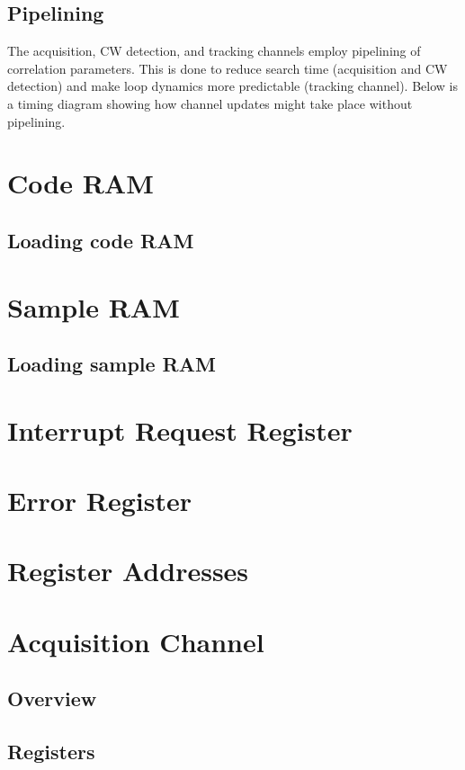 \documentclass{article}
\begin{document}
\begin{multicols}{2}
\subsection{Pipelining}
The acquisition, CW detection, and tracking channels employ pipelining of correlation parameters. This is done to reduce search time (acquisition and CW detection) and make loop dynamics more predictable (tracking channel). Below is a timing diagram showing how channel updates might take place without pipelining.

\section{Code RAM}
\subsection{Loading code RAM}

\section{Sample RAM}
\subsection{Loading sample RAM}

\section{Interrupt Request Register}

\section{Error Register}

\section{Register Addresses}

\hypertarget{acqlink}{}
\section{Acquisition Channel}
\subsection{Overview}
\subsection{Registers}

\end{multicols}
\end{document}
